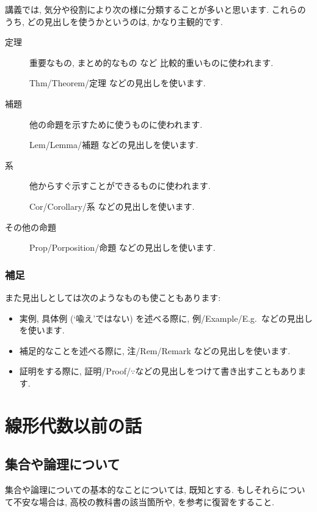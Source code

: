 講義では, 
気分や役割により次の様に分類することが多いと思います.
これらのうち, どの見出しを使うかというのは, 
かなり主観的です.
\begin{description}
\item[定理]
重要なもの, まとめ的なもの など 比較的重いものに使われます.

Thm/Theorem/定理  などの見出しを使います.

\item[補題]
他の命題を示すために使うものに使われます.

Lem/Lemma/補題  などの見出しを使います.

\item[系]
他からすぐ示すことができるものに使われます.

Cor/Corollary/系  などの見出しを使います.
\item[その他の命題]

Prop/Porposition/命題  などの見出しを使います.
\end{description}

\subsection{補足}
また見出しとしては次のようなものも使こともあります:
\begin{itemize}
 \item 
実例, 具体例 (`喩え'ではない) を述べる際に,
例/Example/E.g.\   などの見出しを使います.
\item
補足的なことを述べる際に,
注/Rem/Remark   などの見出しを使います.
\item
証明をする際に,
証明/Proof/$\because$などの見出しをつけて書き出すこともあります.
\end{itemize}
\tableofcontents


\renewcommand{\thesection}{\originalthesection}
\mainmatter

\chapter{線形代数以前の話}


\section{集合や論理について}

集合や論理についての基本的なことについては,
既知とする.
もしそれらについて不安な場合は,
高校の教科書の該当箇所や,
\cite{978-4-535-78682-0}
を参考に復習をすること.

